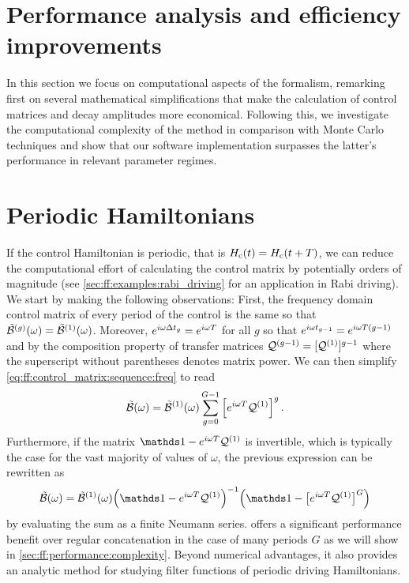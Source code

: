 \section{Performance analysis and efficiency improvements}\label{sec:ff:performance}
In this section we focus on computational aspects of the formalism, remarking first on several mathematical simplifications that make the calculation of control matrices and decay amplitudes more economical.
Following this, we investigate the computational complexity of the method in comparison with Monte Carlo techniques and show that our software implementation surpasses the latter's performance in relevant parameter regimes.

\section{Periodic Hamiltonians}\label{sec:ff:performance:periodic_hamiltonians}
If the control Hamiltonian is periodic, that is $H_{\mathrm{c}}(t) = H_{\mathrm{c}}(t + T)$, we can reduce the computational effort of calculating the control matrix by potentially orders of magnitude (see \cref{sec:ff:examples:rabi_driving} for an application in Rabi driving).
We start by making the following observations: First, the frequency domain control matrix of every period of the control is the same so that $\tilde{\mathcal{B}}^{(g)}(\omega) = \tilde{\mathcal{B}}^{(1)}(\omega)$.
Moreover, $e^{i\omega\Delta t_g} = e^{i\omega T}$ for all $g$ so that $e^{i\omega t_{g-1}} = e^{i\omega T(g - 1)}$ and by the composition property of transfer matrices $\mathcal{Q}^{(g-1)} = [\mathcal{Q}^{(1)}]^{g-1}$ where the superscript without parentheses denotes matrix power.
We can then simplify \cref{eq:ff:control_matrix:sequence:freq} to read
\begin{equation}\label{eq:ff:control_matrix:sequence:periodic:explicit}
\tilde{\mathcal{B}}(\omega) = \tilde{\mathcal{B}}^{(1)}(\omega)\sum_{g=0}^{G-1}\left[e^{i\omega T}\mathcal{Q}^{(1)}\right]^g.
\end{equation}
Furthermore, if the matrix $\eye - \e^{\i\omega T}\liouvQ\gth{1}$ is invertible, which is typically the case for the vast majority of values of $\omega$, the previous expression can be rewritten as
\begin{equation}\label{eq:ff:control_matrix:sequence:periodic:simplified}
\ctrlmat(\omega) = \ctrlmat\gth{1}(\omega)\Bigl(\eye - \e^{\i\omega T}\liouvQ\gth{1}\Bigr)^{-1}
\Bigl(\eye - \bigl[\e^{\i\omega T}\liouvQ\gth{1}\bigr]^G\Bigr)
\end{equation}
by evaluating the sum as a finite Neumann series.
 offers a significant performance benefit over regular concatenation in the case of many periods $G$ as we will show in \cref{sec:ff:performance:complexity}.
Beyond numerical advantages, it also provides an analytic method for studying filter functions of periodic driving Hamiltonians.


